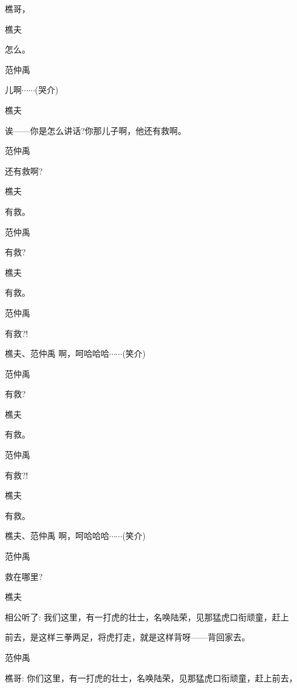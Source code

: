 樵哥，

樵夫\hspace{30pt}~

怎么。

范仲禹\hspace{20pt}~

儿啊$\cdots{}\cdots{}$(哭介)

樵夫\hspace{30pt}~

诶------你是怎么讲话?你那儿子啊，他还有救啊。

范仲禹\hspace{20pt}~

还有救啊?

樵夫\hspace{30pt}~

有救。

范仲禹\hspace{20pt}~

有救?

樵夫\hspace{30pt}~

有救。

范仲禹\hspace{20pt}~

有救?!

樵夫、范仲禹 啊，呵哈哈哈$\cdots{}\cdots{}$(笑介)

范仲禹\hspace{20pt}~

有救?

樵夫\hspace{30pt}~

有救。

范仲禹\hspace{20pt}~

有救?!

樵夫\hspace{30pt}~

有救。

樵夫、范仲禹 啊，呵哈哈哈$\cdots{}\cdots{}$(笑介)

范仲禹\hspace{20pt}~

救在哪里?

樵夫

相公听了: 我们这里，有一打虎的壮士，名唤陆荣，见那猛虎口衔顽童，赶上

前去，是这样三拳两足，将虎打走，就是这样背呀------背回家去。

范仲禹

樵哥: 你们这里，有一打虎的壮士，名唤陆荣，见那猛虎口衔顽童，赶上前去，

